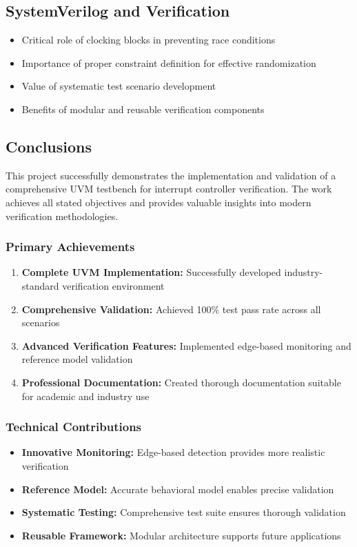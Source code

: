 \documentclass[12pt,a4paper]{article}
\begin{document}
\subsection{SystemVerilog and Verification}
\begin{itemize}
    \item Critical role of clocking blocks in preventing race conditions
    \item Importance of proper constraint definition for effective randomization
    \item Value of systematic test scenario development
    \item Benefits of modular and reusable verification components
\end{itemize}



\subsection{Conclusions}
This project successfully demonstrates the implementation and validation of a comprehensive UVM testbench for interrupt controller verification. The work achieves all stated objectives and provides valuable insights into modern verification methodologies.

\subsubsection{Primary Achievements}
\begin{enumerate}
    \item \textbf{Complete UVM Implementation:} Successfully developed industry-standard verification environment
    \item \textbf{Comprehensive Validation:} Achieved 100\% test pass rate across all scenarios
    \item \textbf{Advanced Verification Features:} Implemented edge-based monitoring and reference model validation
    \item \textbf{Professional Documentation:} Created thorough documentation suitable for academic and industry use
\end{enumerate}

\subsubsection{Technical Contributions}
\begin{itemize}
    \item \textbf{Innovative Monitoring:} Edge-based detection provides more realistic verification
    \item \textbf{Reference Model:} Accurate behavioral model enables precise validation
    \item \textbf{Systematic Testing:} Comprehensive test suite ensures thorough validation
    \item \textbf{Reusable Framework:} Modular architecture supports future applications
\end{itemize}
\end{document}
